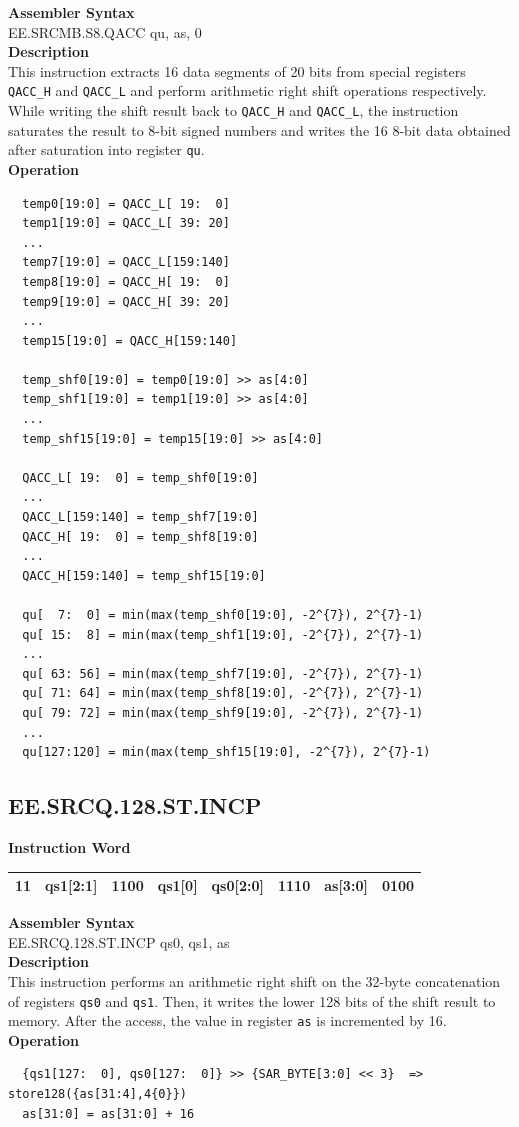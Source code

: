 \textbf{Assembler Syntax} \\
EE.SRCMB.S8.QACC qu, as, 0 \\
\textbf{Description} \\
This instruction extracts 16 data segments of 20 bits from special registers \lstinline{QACC_H} and \lstinline{QACC_L} and perform arithmetic right shift operations respectively. While writing the shift result back to \lstinline{QACC_H} and \lstinline{QACC_L}, the instruction saturates the result to 8-bit signed numbers and writes the 16 8-bit data obtained after saturation into register \lstinline{qu}.\\
\textbf{Operation}
\begin{lstlisting}
  temp0[19:0] = QACC_L[ 19:  0]
  temp1[19:0] = QACC_L[ 39: 20]
  ...
  temp7[19:0] = QACC_L[159:140]
  temp8[19:0] = QACC_H[ 19:  0]
  temp9[19:0] = QACC_H[ 39: 20]
  ...
  temp15[19:0] = QACC_H[159:140]

  temp_shf0[19:0] = temp0[19:0] >> as[4:0]
  temp_shf1[19:0] = temp1[19:0] >> as[4:0]
  ...
  temp_shf15[19:0] = temp15[19:0] >> as[4:0]

  QACC_L[ 19:  0] = temp_shf0[19:0]
  ...
  QACC_L[159:140] = temp_shf7[19:0]
  QACC_H[ 19:  0] = temp_shf8[19:0]
  ...
  QACC_H[159:140] = temp_shf15[19:0]

  qu[  7:  0] = min(max(temp_shf0[19:0], -2^{7}), 2^{7}-1)
  qu[ 15:  8] = min(max(temp_shf1[19:0], -2^{7}), 2^{7}-1)
  ...
  qu[ 63: 56] = min(max(temp_shf7[19:0], -2^{7}), 2^{7}-1)
  qu[ 71: 64] = min(max(temp_shf8[19:0], -2^{7}), 2^{7}-1)
  qu[ 79: 72] = min(max(temp_shf9[19:0], -2^{7}), 2^{7}-1)
  ...
  qu[127:120] = min(max(temp_shf15[19:0], -2^{7}), 2^{7}-1)
\end{lstlisting}

\clearpage
\subsection{EE.SRCQ.128.ST.INCP}\label{instruction:EESRCQ128STINCP}
\setlength\tabcolsep{6pt}
\textbf{Instruction Word} \\
\begin{tabular}{|c|c|c|c|c|c|c|c|}
	\hline
	11 & qs1[2:1] & 1100 & qs1[0] & qs0[2:0] & 1110 & as[3:0] & 0100 \\
	\hline
\end{tabular}

\textbf{Assembler Syntax} \\
EE.SRCQ.128.ST.INCP qs0, qs1, as \\
\textbf{Description} \\
This instruction performs an arithmetic right shift on the 32-byte concatenation of registers \lstinline{qs0} and \lstinline{qs1}. Then, it writes the lower 128 bits of the shift result to memory. After the access, the value in register \lstinline{as} is incremented by 16.\\
\textbf{Operation}
\begin{lstlisting}
  {qs1[127:  0], qs0[127:  0]} >> {SAR_BYTE[3:0] << 3}  => store128({as[31:4],4{0}})
  as[31:0] = as[31:0] + 16
\end{lstlisting}

